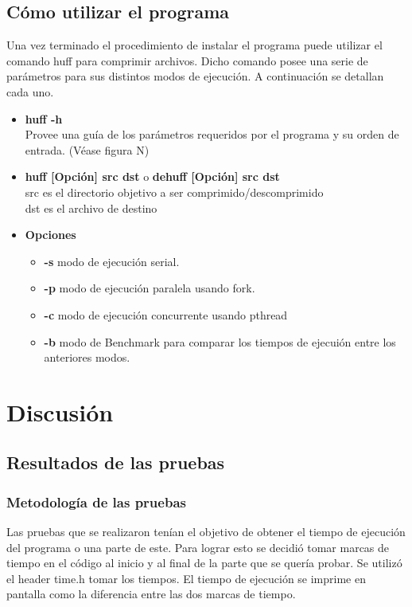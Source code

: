 \documentclass{report}
\begin{document}
\subsection{Cómo utilizar el programa}
Una vez terminado el procedimiento de instalar el programa puede utilizar el comando huff para comprimir archivos. Dicho comando posee una serie de parámetros para sus distintos modos de ejecución. A continuación se detallan cada uno.
\begin{itemize}
  \item \textbf{huff -h}\\ \hspace{2cm}
    Provee una guía de los parámetros requeridos por el programa y su orden de entrada. (Véase figura N)
  \item \textbf{huff [Opción] src dst} o \textbf{dehuff [Opción] src dst}\\
src es el directorio objetivo a ser comprimido/descomprimido\\
dst es el archivo de destino
  \item \textbf{Opciones} 
    \begin{itemize}
      \item \textbf{-s} modo de ejecución serial.
      \item \textbf{-p} modo de ejecución paralela usando fork.
      \item \textbf{-c} modo de ejecución concurrente usando pthread
      \item \textbf{-b} modo de Benchmark para comparar los tiempos de ejecuión entre los anteriores modos.
    \end{itemize}
\end{itemize}





\section{Discusión}
\subsection{Resultados de las pruebas}
\subsubsection{Metodología de las pruebas}

Las pruebas que se realizaron tenían el objetivo de obtener el tiempo de ejecución del programa o una parte de este. Para lograr esto se decidió tomar marcas de tiempo en el código al inicio y al final de la parte que se quería probar. Se utilizó el header time.h tomar los tiempos. El tiempo de ejecución  se imprime en pantalla como la diferencia entre las dos marcas de tiempo.
\end{document}
